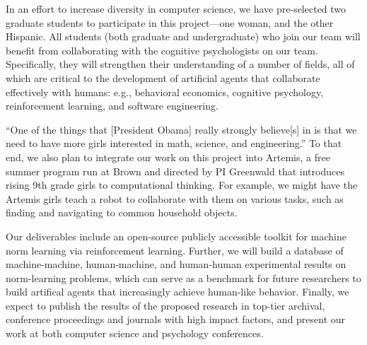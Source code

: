 In an effort to increase diversity in computer science, we have
pre-selected two graduate students to participate in this
project---one woman, and the other Hispanic.  All students (both
graduate and undergraduate) who join our team will benefit from collaborating with the cognitive psychologists on our team.
Specifically, they will strengthen their understanding of a number of
fields, all of which are critical to the development of artificial
agents that collaborate effectively with humans: e.g., behavioral
economics, cognitive psychology, reinforcement learning, and software
engineering.

``One of the things that [President Obama] really strongly believe[s]
in is that we need to have more girls interested in math, science, and
engineering.''  To that end, we also plan to integrate our work on
this project into Artemis, a free summer program run at Brown and
directed by PI Greenwald that introduces rising 9th grade girls to
computational thinking.
For example, we might have the Artemis girls teach a robot to
collaborate with them on various tasks, such as finding and navigating
to common household objects.

Our deliverables include an open-source publicly accessible toolkit for machine norm learning via reinforcement learning. Further, we will build a database of machine-machine, human-machine, and human-human experimental results on norm-learning problems, which can serve as a benchmark for future researchers to build artifical agents that increasingly achieve human-like behavior. 
%
Finally, we expect to publish the results of the proposed research in
top-tier archival, conference proceedings and journals with high
impact factors, and present our work at both computer science and
psychology conferences.




